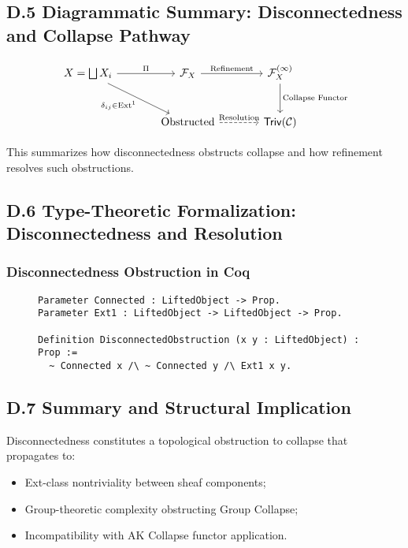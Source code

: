 \documentclass[11pt]{article}
\begin{document}
\subsection*{D.5 Diagrammatic Summary: Disconnectedness and Collapse Pathway}

\[
\begin{tikzcd}[column sep=large, row sep=large]
X = \bigsqcup X_i \arrow[r, "\Pi"] \arrow[dr, "\delta_{ij} \in \mathrm{Ext}^1"']
& \mathcal{F}_X \arrow[r, "\mathrm{Refinement}"]
& \mathcal{F}_X^{(\infty)} \arrow[d, "\text{Collapse Functor}"] \\
& \text{Obstructed} \arrow[r, dashed, "\text{Resolution}"]
& \mathsf{Triv}(\mathcal{C})
\end{tikzcd}
\]

This summarizes how disconnectedness obstructs collapse and how refinement resolves such obstructions.

\subsection*{D.6 Type-Theoretic Formalization: Disconnectedness and Resolution}

\subsubsection*{Disconnectedness Obstruction in Coq}

\begin{figure}[h]
\centering
\begin{lstlisting}[language=Coq, caption=Disconnectedness Obstruction Predicate]
Parameter Connected : LiftedObject -> Prop.
Parameter Ext1 : LiftedObject -> LiftedObject -> Prop.

Definition DisconnectedObstruction (x y : LiftedObject) : Prop :=
  ~ Connected x /\ ~ Connected y /\ Ext1 x y.
\end{lstlisting}
\end{figure}

\subsection*{D.7 Summary and Structural Implication}

Disconnectedness constitutes a topological obstruction to collapse that propagates to:

\begin{itemize}
    \item Ext-class nontriviality between sheaf components;
    \item Group-theoretic complexity obstructing Group Collapse;
    \item Incompatibility with AK Collapse functor application.
\end{itemize}
\end{document}
